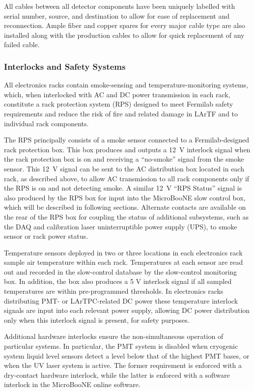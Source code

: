 All cables between all detector components have been uniquely labelled with serial number, source, and destination to allow for ease of replacement and reconnection.  Ample fiber and copper spares for every major cable type are also installed along with the production cables to allow for quick replacement of any failed cable.

\subsubsection{Interlocks and Safety Systems}
All electronics racks contain smoke-sensing and temperature-monitoring systems, which, when interlocked with AC and DC power transmission in each rack, constitute a rack protection system (RPS) designed to meet Fermilab safety requirements and reduce the risk of fire and related damage in LArTF and to individual rack components.

The RPS principally consists of a smoke sensor connected to a Fermilab-designed rack protection box.  This box produces and outputs a 12~V interlock signal when the rack protection box is on and receiving a ``no-smoke'' signal from the smoke sensor.  This 12~V signal can be sent to the AC distribution box located in each rack, as described above, to allow AC transmission to all rack components only if the RPS is on and not detecting smoke.  A similar 12~V ``RPS Status'' signal is also produced by the RPS box for input into the MicroBooNE slow control box, which will be described in following sections.  Alternate contacts are available on the rear of the RPS box for coupling the status of additional subsystems, such as the DAQ and calibration laser uninterruptible power supply (UPS), to smoke sensor or rack power status.

Temperature sensors deployed in two or three locations in each electronics rack sample air temperature within each rack.  Temperatures at each sensor are read out and recorded in the slow-control database by the slow-control monitoring box.  In addition, the box also produces a 5 V interlock signal if all sampled temperatures are within pre-programmed thresholds.  In electronics racks distributing PMT- or LArTPC-related DC power these temperature interlock signals are input into each relevant power supply, allowing DC power distribution only when this interlock signal is present, for safety purposes.

Additional hardware interlocks ensure the non-simultaneous operation of particular systems.  In particular, the PMT system is disabled when cryogenic system liquid level sensors detect a level below that of the highest PMT bases, or when the UV laser system is active.  The former requirement is enforced with a dry-contact hardware interlock, while the latter is enforced with a software interlock in the MicroBooNE online software.


